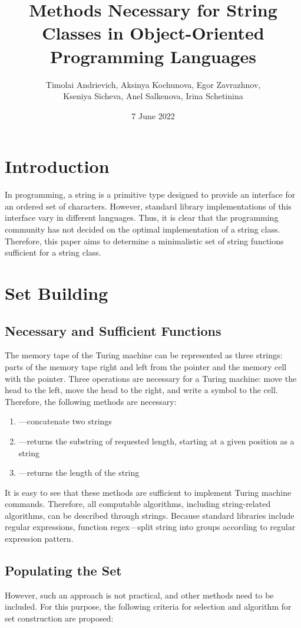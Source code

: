 \documentclass[11pt,nonacm,natbib=false]{acmart}
\title{Methods Necessary for String Classes in Object-Oriented Programming Languages}
\author{
Timolai Andrievich, 
 Aksinya Kochunova, 
 Egor Zavrazhnov, \\
 Kseniya Sicheva, 
 Anel Salkenova, 
 Irina Schetinina 
}
\date{7 June 2022}
\affil{Innopolis University}
\begin{document}
\maketitle

\section{Introduction}
In programming, a string is a primitive type designed to provide an interface for an ordered set of characters. However, standard library implementations of this interface vary in different languages. Thus, it is clear that the programming community has not decided on the optimal implementation of a string class. Therefore, this paper aims to determine a minimalistic set of string functions sufficient for a string class.

\section{Set Building}
\subsection{Necessary and Sufficient Functions}
The memory tape of the Turing machine can be represented as three strings: parts of the memory tape right and left from the pointer and the memory cell with the pointer. Three operations are necessary for a Turing machine: move the head to the left, move the head to the right, and write a symbol to the cell. Therefore, the following methods are necessary:
\begin{enumerate}
    \item {}---concatenate two strings
    \item {}---returns the substring of requested length, starting at a given position as a string
    \item {}---returns the length of the string
\end{enumerate}
It is easy to see that these methods are sufficient to implement Turing machine commands. Therefore, all computable algorithms, including string-related algorithms, can be described through strings. Because standard libraries include regular expressions, function regex---split string into groups according to regular expression pattern.
\subsection{Populating the Set}
However, such an approach is not practical, and other methods need to be  included. For this purpose, the following criteria for selection and algorithm for set construction are proposed:
\end{document}
